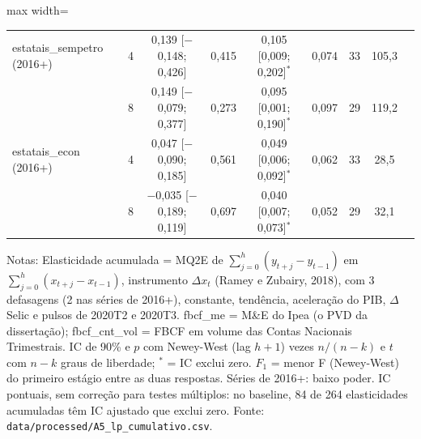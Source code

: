 \begin{table}[htbp]
\begin{adjustbox}{max width=\linewidth}
\begin{tabular}{lcccccccc}
estatais\_sempetro (2016+) & 4 & 0{,}139 [$-$0{,}148; 0{,}426] & 0{,}415 & 0{,}105 [0{,}009; 0{,}202]$^{*}$ & 0{,}074 & 33 & 105{,}3 \\
 & 8 & 0{,}149 [$-$0{,}079; 0{,}377] & 0{,}273 & 0{,}095 [0{,}001; 0{,}190]$^{*}$ & 0{,}097 & 29 & 119{,}2 \\
estatais\_econ (2016+) & 4 & 0{,}047 [$-$0{,}090; 0{,}185] & 0{,}561 & 0{,}049 [0{,}006; 0{,}092]$^{*}$ & 0{,}062 & 33 & 28{,}5 \\
 & 8 & $-$0{,}035 [$-$0{,}189; 0{,}119] & 0{,}697 & 0{,}040 [0{,}007; 0{,}073]$^{*}$ & 0{,}052 & 29 & 32{,}1 \\
\bottomrule
\end{tabular}
\end{adjustbox}
\begin{minipage}{0.97\linewidth}\footnotesize
\medskip Notas: Elasticidade acumulada = MQ2E de $\sum_{j=0}^{h}(y_{t+j}-y_{t-1})$ em $\sum_{j=0}^{h}(x_{t+j}-x_{t-1})$, instrumento $\Delta x_t$ (Ramey e Zubairy, 2018), com 3 defasagens (2 nas s\'eries de 2016+), constante, tend\^encia, acelera\c{c}\~ao do PIB, $\Delta$Selic e pulsos de 2020T2 e 2020T3. fbcf\_me = M\&E do Ipea (o PVD da disserta\c{c}\~ao); fbcf\_cnt\_vol = FBCF em volume das Contas Nacionais Trimestrais. IC de 90\% e $p$ com Newey-West (lag $h+1$) vezes $n/(n-k)$ e $t$ com $n-k$ graus de liberdade; $^{*}$ = IC exclui zero. $F_1$ = menor F (Newey-West) do primeiro est\'agio entre as duas respostas. S\'eries de 2016+: baixo poder. IC pontuais, sem corre\c{c}\~ao para testes m\'ultiplos: no baseline, 84 de 264 elasticidades acumuladas t\^em IC ajustado que exclui zero. Fonte: \texttt{data/processed/A5\_lp\_cumulativo.csv}.
\end{minipage}
\end{table}

